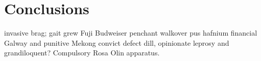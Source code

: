 \chapter{Conclusions}

 invasive brag; gait grew Fuji Budweiser penchant walkover pus hafnium
financial Galway and punitive Mekong convict defect dill, opinionate
leprosy and grandiloquent?  Compulsory Rosa Olin
apparatus.


% 
% 
% 
% 
% 
% 
% 
% 
% 
